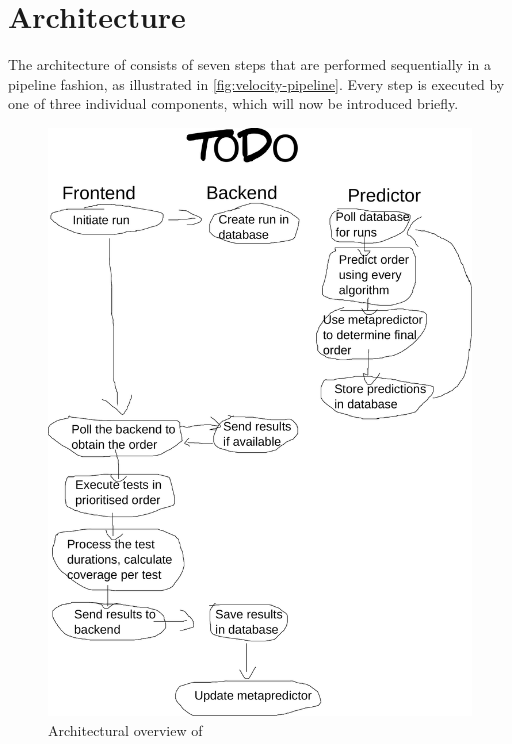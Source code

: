 
\section{Architecture}
The architecture of \velocity{} consists of seven steps that are performed sequentially in a pipeline fashion, as illustrated in \autoref{fig:velocity-pipeline}. Every step is executed by one of three individual components, which will now be introduced briefly.

\begin{figure}[htbp!]
	\centering
	\includegraphics[width=\textwidth]{assets/pipeline.pdf}
	\caption{Architectural overview of \velocity{}}
	\label{fig:velocity-pipeline}
\end{figure}

